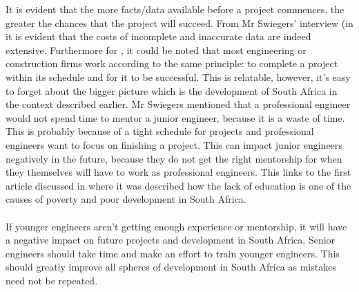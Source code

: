 It is evident that the more facts/data available before a project commences, the greater the chances that the project will succeed. From Mr Swiegers’ interview (in \textbf{} it is evident that the costs of incomplete and inaccurate data are indeed extensive. Furthermore for \textbf{}, it could be noted that most engineering or construction firms work according to the same principle: to complete a project within its schedule and for it to be successful. This is relatable, however, it's easy to forget about the bigger picture which is the development of South Africa in the context described earlier. Mr Swiegers mentioned that a professional engineer would not spend time to mentor a junior engineer, because it is a waste of time. This is probably because of a tight schedule for projects and professional engineers want to focus on finishing a project. This can impact junior engineers negatively in the future, because they do not get the right mentorship for when they themselves will have to work as professional engineers. This links to the first article discussed in \textbf{} where it was described how the lack of education is one of the causes of poverty and poor development in South Africa. 
\\\\
If younger engineers aren't getting enough experience or mentorship, it will have a negative impact on future projects and development in South Africa. Senior engineers should take time and make an effort to train younger engineers. This should greatly improve all spheres of development in South Africa as mistakes need not be repeated. 
